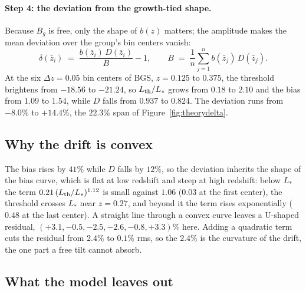 \paragraph{Step 4: the deviation from the growth-tied shape.}
Because $B_g$ is free, only the shape of $b(z)$ matters; the amplitude
makes the mean deviation over the group's bin centers vanish:
\begin{equation}
  \delta(\bar{z}_i)
  \;=\;
  \frac{b(\bar{z}_i)\,D(\bar{z}_i)}{B} - 1,
  \qquad
  B \;=\; \frac{1}{n}\sum_{j=1}^{n} b(\bar{z}_j)\,D(\bar{z}_j).
  \label{eq:bgsdelta}
\end{equation}
At the six $\Delta z = 0.05$ bin centers of BGS, $z = 0.125$ to
$0.375$, the threshold brightens from $-18.56$ to $-21.24$, so
$L_{\rm th}/L_*$ grows from $0.18$ to $2.10$ and the bias from $1.09$
to $1.54$, while $D$ falls from $0.937$ to $0.824$.  The deviation runs
from $-8.0\%$ to $+14.4\%$, the $22.3\%$ span of
Figure~\ref{fig:theorydelta}.

\subsection{Why the drift is convex}
\label{sec:bgsconvex}

The bias rises by $41\%$ while $D$ falls by $12\%$, so the deviation
inherits the shape of the bias curve, which is flat at low redshift
and steep at high redshift: below $L_*$ the term
$0.21\,(L_{\rm th}/L_*)^{1.12}$ is small against $1.06$ ($0.03$ at the
first center), the threshold crosses $L_*$ near $z = 0.27$, and beyond
it the term rises exponentially ($0.48$ at the last center).  A
straight line through a convex curve leaves a U-shaped residual,
$(+3.1, -0.5, -2.5, -2.6, -0.8, +3.3)\%$ here.  Adding a quadratic term
cuts the residual from $2.4\%$ to $0.1\%$ rms, so the $2.4\%$ is the
curvature of the drift, the one part a free tilt cannot absorb.

\subsection{What the model leaves out}
\label{sec:bgsomissions}

